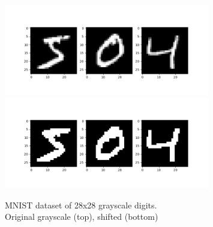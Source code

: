 \documentclass[11pt]{article}
\begin{document}
	\begin{figure}
	\begin{center}
	\includegraphics[width=0.8\textwidth]{../img/digits.png}
	\includegraphics[width=0.8\textwidth]{../img/digits_shifted.png}
	\caption{MNIST dataset of 28x28 grayscale digits.\\ Original grayscale (top), shifted (bottom)}
	\end{center}	
	\label{fig:digits}
	\end{figure}
%
%	
	
\end{document}
